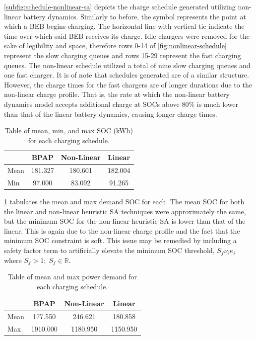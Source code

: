 \documentclass[ee,thesis]{usuthesis}
\begin{document}
\ref{subfig:schedule-nonlinear-sa} depicts the charge schedule generated utilizing non-linear battery dynamics.
Similarly to before, the symbol represents the point at which a BEB begins charging. The horizontal line with vertical
tic indicate the time over which said BEB receives its charge. Idle chargers were removed for the sake of legibility and
space, therefore rows 0-14 of \ref{fig:nonlinear-schedule} represent the slow charging queues and rows 15-29 represent
the fast charging queues. The non-linear schedule utilized a total of nine slow charging queues and one fast charger. It
is of note that schedules generated are of a similar structure. However, the charge times for the fast chargers are of
longer durations due to the non-linear charge profile. That is, the rate at which the non-linear battery dynamics model
accepts additional charge at SOCs above 80\% is much lower than that of the linear battery dynamics, causing longer
charge times.

\begin{table}[htbp]
\caption{\label{tab:nonlinear-charge}Table of mean, min, and max SOC (kWh) for each charging schedule.}
\centering
\begin{tabular}{l|ccc}
\hline
 & BPAP & Non-Linear & Linear\\[0pt]
\hline
Mean & 181.327 & 180.601 & 182.004\\[0pt]
Min & 97.000 & 83.092 & 91.265\\[0pt]
\hline
\end{tabular}
\end{table}

\ref{tab:nonlinear-charge} tabulates the mean and max demand SOC for each. The mean SOC for both the linear and
non-linear heuristic SA techniques were approximately the same, but the minimum SOC for the non-linear heuristic SA is
lower than that of the linear. This is again due to the non-linear charge profile and the fact that the minimum SOC
constraint is soft. This issue may be remedied by including a safety factor term to artificially elevate the minimum SOC
threshold, \(S_{f}\nu_i \kappa_i\) where \(S_{f} > 1;\; S_f \in \mathbb{R}\).

\begin{table}[htbp]
\caption{\label{tab:nonlinear-power}Table of mean and max power demand for each charging schedule.}
\centering
\begin{tabular}{l|ccc}
\hline
 & BPAP & Non-Linear & Linear\\[0pt]
\hline
Mean & 177.550 & 246.621 & 180.858\\[0pt]
Max & 1910.000 & 1180.950 & 1150.950\\[0pt]
\hline
\end{tabular}
\end{table}
\end{document}
